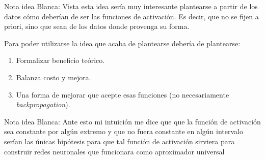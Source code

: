 \iconoAclaraciones \textcolor{dark_green}{ Nota idea Blanca: Vista esta idea sería muy interesante plantearse a partir de los datos cómo deberían de ser las funciones de activación. Es decir, que no se fijen a priori, sino que sean de los datos donde provenga su forma.}

Para poder utilizarse la idea que acaba de plantearse debería de plantearse: 
\begin{enumerate}
    \item Formalizar beneficio teórico.
    \item Balanza costo y mejora.
    \item Una forma de mejorar que acepte esas funciones (no necesariamente \textit{backpropagation}).
\end{enumerate}

\iconoAclaraciones \textcolor{dark_green}{ Nota idea Blanca: Ante esto mi intuición me dice que que la función de activación sea constante por algún extremo y que no fuera constante en algún intervalo serían las únicas hipótesis para que tal función de activación sirviera para construir redes neuronales que funcionara como aproximador universal}



